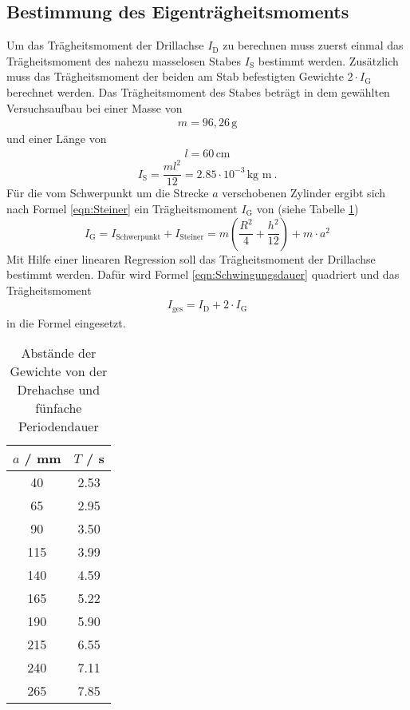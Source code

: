 \subsection{Bestimmung des Eigenträgheitsmoments}
Um das Trägheitsmoment der Drillachse $I_\text{D}$ zu berechnen muss zuerst einmal das Trägheitsmoment des nahezu masselosen Stabes $I_\text{S}$ bestimmt werden. Zusätzlich muss das Trägheitsmoment der beiden am Stab befestigten Gewichte $2 \cdot I_\text{G}$ berechnet werden. Das Trägheitsmoment des Stabes beträgt in dem gewählten Versuchsaufbau bei einer Masse von
\begin{align*}
	m = 96,26 \, \text{g}
\end{align*}
und einer Länge von
\begin{align*}
	l = 60 \, \text{cm}
\end{align*}
\begin{equation}
	I_\text{S} = \frac{ml^2}{12}= 2.85 \cdot 10^{-3} \, \text{kg m} \ .
\end{equation}
Für die vom Schwerpunkt um die Strecke $a$ verschobenen Zylinder ergibt sich nach Formel \ref{eqn:Steiner} ein Trägheitsmoment $I_\text{G}$ von (siehe Tabelle \ref{tab:I_D})
\begin{equation}
	I_\text{G}= I_\text{Schwerpunkt}+ I_\text{Steiner} = m (\frac{R^2}{4} + \frac{h^2}{12}) + m \cdot a^{2}
\end{equation}
Mit Hilfe einer linearen Regression soll das Trägheitsmoment der Drillachse bestimmt werden. Dafür wird Formel \ref{eqn:Schwingungsdauer} quadriert und das Trägheitsmoment
\begin{align*}
	I_\text{ges} = I_\text{D} + 2 \cdot I_\text{G}
\end{align*}
in die Formel eingesetzt.
\begin{table}[ht]
        \centering
        \caption{Abstände der Gewichte von der Drehachse und fünfache Periodendauer}
        \label{tab:I_D}
        \begin{tabular}{c c}
                \toprule
                $a$ / mm & $T$ / s  \\
                \midrule
                40 & 2.53  \\
                65 & 2.95  \\
                90 & 3.50  \\
                115& 3.99  \\
                140& 4.59  \\
                165& 5.22  \\
                190& 5.90  \\
                215& 6.55  \\
                240& 7.11  \\
                265& 7.85  \\

                \bottomrule
        \end{tabular}
\end{table}
